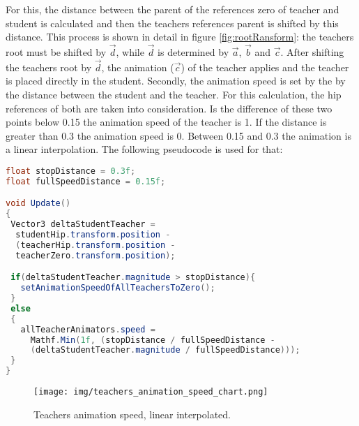 For this, the distance between the parent of the references zero of teacher and student is calculated and then the teachers references parent is shifted by this distance. This process is shown in detail in figure \ref{fig:rootRansform}: the teachers root must be shifted by $\vec{d}$, while $\vec{d}$ is determined by $\vec{a}$, $\vec{b}$ and $\vec{c}$. After shifting the teachers root by $\vec{d}$, the animation ($\vec{c}$) of the teacher applies and the teacher is placed directly in the student. Secondly, the animation speed is set by the by the distance between the student and the teacher. For this calculation, the hip references of both are taken into consideration. Is the difference of these two points below 0.15 the animation speed of the teacher is 1. If the distance is greater than 0.3 the animation speed is 0. Between 0.15 and 0.3 the animation is a linear interpolation. The following pseudocode is used for that:
\newpage
\begin{lstlisting}[language=JAVA, frame=single]
float stopDistance = 0.3f;
float fullSpeedDistance = 0.15f;

void Update()
{
 Vector3 deltaStudentTeacher =
  studentHip.transform.position -
  (teacherHip.transform.position -
  teacherZero.transform.position);

 if(deltaStudentTeacher.magnitude > stopDistance){
   setAnimationSpeedOfAllTeachersToZero();
 }
 else
 {
   allTeacherAnimators.speed =
     Mathf.Min(1f, (stopDistance / fullSpeedDistance - 
     (deltaStudentTeacher.magnitude / fullSpeedDistance)));
 }   
}
\end{lstlisting}

\begin{figure}
	\centering
	\texttt{[image: img/teachers\_animation\_speed\_chart.png]}
	\caption{Teachers animation speed, linear interpolated.}
	\label{fig:teachers_animation_speed_chart}
\end{figure}

